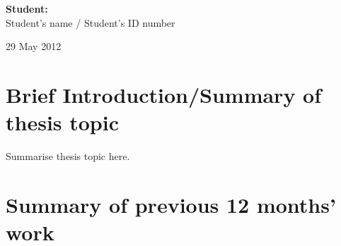\documentclass[useAMS,usenatbib,onecolumn]{mnras}
\begin{document}
\begin{flushright}
{\bf Student:}\\
Student's name / Student's ID number
\end{flushright}\hspace{8cm}


\begin{center}
29 May 2012
\end{center}
\newpage

\date{Date of the review}

\section{Brief Introduction/Summary of thesis topic}
\label{sec:intro}

Summarise thesis topic here.
 

\section{Summary of previous 12 months' work}
\label{sec:summary}
\end{document}
